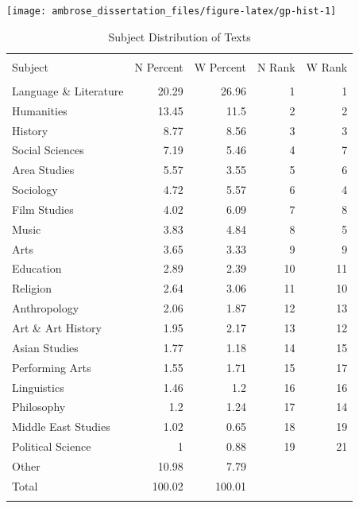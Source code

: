 \documentclass[]{book}
\theoremstyle{definition}
\theoremstyle{definition}
\theoremstyle{definition}
\theoremstyle{remark}
\begin{document}
\begin{center}\texttt{[image: ambrose\_dissertation\_files/figure-latex/gp-hist-1]} \end{center}

\begin{table}[!htbp] \centering 
  \caption{Subject Distribution of Texts} 
  \label{tab:genre-jsubj} 
\begin{tabular}{@{\extracolsep{5pt}} lrrrr} 
\\[-1.8ex]\hline 
\hline \\[-1.8ex] 
Subject & N Percent & W Percent & N Rank & W Rank \\ 
\hline \\[-1.8ex] 
Language \& Literature & 20.29 & 26.96 & 1 & 1 \\ 
Humanities & 13.45 & 11.5 & 2 & 2 \\ 
History & 8.77 & 8.56 & 3 & 3 \\ 
Social Sciences & 7.19 & 5.46 & 4 & 7 \\ 
Area Studies & 5.57 & 3.55 & 5 & 6 \\ 
Sociology & 4.72 & 5.57 & 6 & 4 \\ 
Film Studies & 4.02 & 6.09 & 7 & 8 \\ 
Music & 3.83 & 4.84 & 8 & 5 \\ 
Arts & 3.65 & 3.33 & 9 & 9 \\ 
Education & 2.89 & 2.39 & 10 & 11 \\ 
Religion & 2.64 & 3.06 & 11 & 10 \\ 
Anthropology & 2.06 & 1.87 & 12 & 13 \\ 
Art \& Art History & 1.95 & 2.17 & 13 & 12 \\ 
Asian Studies & 1.77 & 1.18 & 14 & 15 \\ 
Performing Arts & 1.55 & 1.71 & 15 & 17 \\ 
Linguistics & 1.46 & 1.2 & 16 & 16 \\ 
Philosophy & 1.2 & 1.24 & 17 & 14 \\ 
Middle East Studies & 1.02 & 0.65 & 18 & 19 \\ 
Political Science & 1 & 0.88 & 19 & 21 \\ 
Other & 10.98 & 7.79 &  &  \\ 
Total & 100.02 & 100.01 &  &  \\ 
\hline \\[-1.8ex] 
\end{tabular} 
\end{table}
\end{document}
